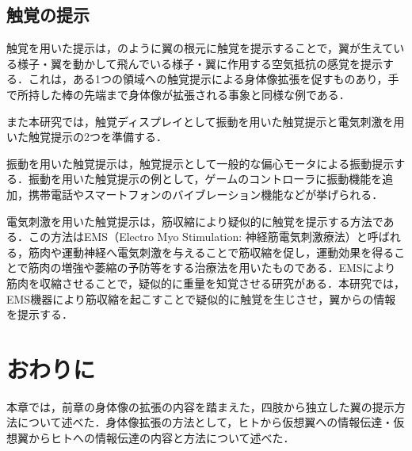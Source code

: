     
    \subsection{触覚の提示}

        触覚を用いた提示は，のように翼の根元に触覚を提示することで，翼が生えている様子・翼を動かして飛んでいる様子・翼に作用する空気抵抗の感覚を提示する．これは，ある1つの領域への触覚提示による身体像拡張を促すものあり，手で所持した棒の先端まで身体像が拡張される事象と同様な例である．
        
        また本研究では，触覚ディスプレイとして振動を用いた触覚提示と電気刺激を用いた触覚提示の2つを準備する．
        
        振動を用いた触覚提示は，触覚提示として一般的な偏心モータによる振動提示する．振動を用いた触覚提示の例として，ゲームのコントローラに振動機能を追加\cite{shim2020fs}，携帯電話やスマートフォンのバイブレーション機能などが挙げられる．

        電気刺激を用いた触覚提示は，筋収縮により疑似的に触覚を提示する方法である．この方法はEMS（Electro Myo Stimulation: 神経筋電気刺激療法）と呼ばれる，筋肉や運動神経へ電気刺激を与えることで筋収縮を促し，運動効果を得ることで筋肉の増強や萎縮の予防等をする治療法を用いたものである．EMSにより筋肉を収縮させることで，疑似的に重量を知覚させる研究がある\cite{小川剛史2017電気的筋肉刺激が重量知覚に及ぼす影響の分析}．本研究では，EMS機器により筋収縮を起こすことで疑似的に触覚を生じさせ，翼からの情報を提示する．

\section{おわりに}
    本章では，前章の身体像の拡張の内容を踏まえた，四肢から独立した翼の提示方法について述べた．身体像拡張の方法として，ヒトから仮想翼への情報伝達・仮想翼からヒトへの情報伝達の内容と方法について述べた．
